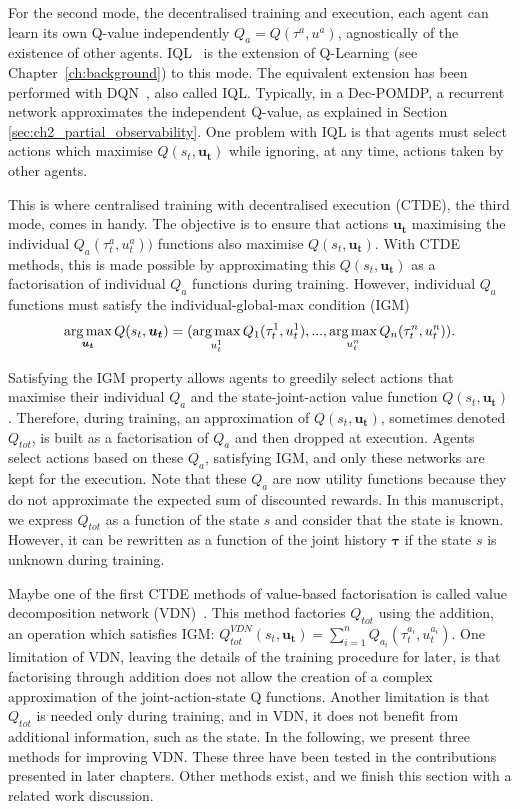 For the second mode, the decentralised training and execution, each agent can learn its own Q-value independently $Q_a=Q(\tau^a, u^a)$, agnostically of the existence of other agents.
IQL~\citep{Tan1993} is the extension of Q-Learning (see Chapter~\ref{ch:background}) to this mode. 
The equivalent extension has been performed with DQN~\citep{TampuuDqnIQL}, also called IQL.
Typically, in a Dec-POMDP, a recurrent network approximates the independent Q-value, as explained in Section \ref{sec:ch2_partial_observability}.
One problem with IQL is that agents must select actions which maximise $Q(s_t, \mathbf{u_t})$ while ignoring, at any time, actions taken by other agents.

This is where centralised training with decentralised execution (CTDE), the third mode, comes in handy.
The objective is to ensure that actions $\mathbf{u_t}$ maximising the individual $Q_a(\tau_t^a, u_t^a))$ functions also maximise $Q(s_t, \mathbf{u_t})$.
With CTDE methods, this is made possible by approximating this $Q(s_t, \mathbf{u_t})$ as a factorisation of individual $Q_a$ functions during training.
However, individual $Q_a$ functions must satisfy the individual-global-max condition (IGM)~\citep{Son2019QTRAN:Learning}
\begin{equation}
    \argmax_{\mathbf{u_t}} Q(s_t, \mathbf{u_t}) =(\argmax_{u_t^{1}} Q_{1}(\tau_t^{1}, u_t^{1}),...,\argmax_{u_t^{n}} Q_{n}(\tau_t^{n}, u_t^{n})).
    \label{eq:ch3_igm}
\end{equation}

Satisfying the IGM property allows agents to greedily select actions that maximise their individual $Q_a$ and the state-joint-action value function $Q(s_t, \mathbf{u_t})$.
Therefore, during training, an approximation of $Q(s_t, \mathbf{u_t})$, sometimes denoted $Q_{tot}$, is built as a factorisation of $Q_a$ and then dropped at execution.
Agents select actions based on these $Q_a$, satisfying IGM, and only these networks are kept for the execution.
Note that these $Q_a$ are now utility functions because they do not approximate the expected sum of discounted rewards.
In this manuscript, we express $Q_{tot}$ as a function of the state $s$ and consider that the state is known.
However, it can be rewritten as a function of the joint history $\mathbf{\tau}$ if the state $s$ is unknown during training.

Maybe one of the first CTDE methods of value-based factorisation is called value decomposition network (VDN)~\citep{sunehag2018vdn}.
This method factories $Q_{tot}$ using the addition, an operation which satisfies IGM: $Q_{tot}^{VDN}(s_t, \mathbf{u_t}) = \sum_{i=1}^n Q_{a_i}(\tau^{a_i}_t, u^{a_i}_t)$.
One limitation of VDN, leaving the details of the training procedure for later, is that factorising through addition does not allow the creation of a complex approximation of the joint-action-state Q functions.
Another limitation is that $Q_{tot}$ is needed only during training, and in VDN, it does not benefit from additional information, such as the state.
In the following, we present three methods for improving VDN.
These three have been tested in the contributions presented in later chapters.
Other methods exist, and we finish this section with a related work discussion.

